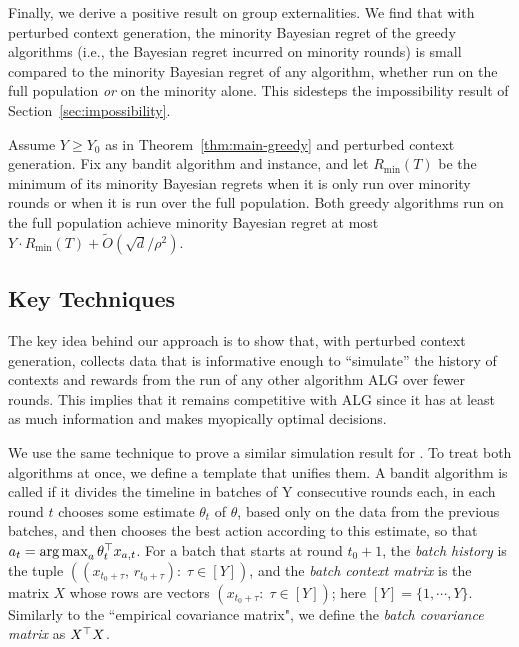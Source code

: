 Finally, we derive a positive result on group externalities. We find that with perturbed context generation, the minority Bayesian regret of the greedy algorithms (i.e., the Bayesian regret incurred on minority rounds) is small compared to the minority Bayesian regret of any algorithm, whether run on the full population \emph{or} on the minority alone. This sidesteps the impossibility result of Section~\ref{sec:impossibility}.

\begin{theorem}
Assume $Y\geq Y_0$ as in Theorem~\ref{thm:main-greedy} and perturbed context generation. Fix any bandit algorithm and instance, and let $R_{\min}(T)$ be the minimum of its minority Bayesian regrets when it is only run over minority rounds or when it is run over the full population. Both greedy algorithms run on the full population achieve minority Bayesian regret at most
    $Y\cdot R_{\min}(T) + \tilde O(\sqrt{d}/\rho^2)$.
  \label{thm:main-greedy-externalities}
\end{theorem}

\subsection{Key Techniques}
\label{sec:bayesian_greedy-key}

The key idea behind our approach is to show that, with perturbed context generation, \BayesGreedy collects data that is informative enough to
``simulate'' the history of contexts and rewards from the run of any other algorithm ALG over fewer rounds. This implies that it remains competitive with ALG since it has at least as much information and makes myopically optimal decisions. 

We use the same technique to prove a similar simulation result for \FreqGreedy. To treat both algorithms at once, we define a template that unifies them. A bandit algorithm is called \emph{\GreedyStyle} if it divides the timeline in batches of Y consecutive rounds each, in each round $t$ chooses some estimate $\theta_t$ of $\theta$, based only on the data from the previous batches, and then chooses the best action according to this estimate, so that
   $a_t = \operatorname*{arg\,max}_a \theta_t^{\top} x_{a,t}$.
 For a batch that starts at round $t_0+1$, the \emph{batch history} is the tuple
 $((x_{t_0+\tau},\,r_{t_0+\tau}):\; \tau\in [Y])$,
 and the \emph{batch context matrix} is the matrix $X$ whose rows are vectors
 $(x_{t_0+\tau}:\; \tau\in [Y])$;
 here $[Y] = \{1, \cdots, Y\}$. Similarly to the ``empirical covariance matrix",
 we define the \emph{batch covariance matrix} as $X^{\top} X$.

